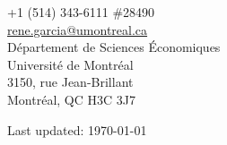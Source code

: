 \documentclass[margin,line]{res}
\begin{document}
\begin{resume}
\begin{minipage}{0.45\resumewidth}
  +1 (514) 343-6111 \#28490                                                               \\
  \href{mailto:rene.garcia@umontreal.ca}{rene.garcia@umontreal.ca}                        \\
  D\'epartement de Sciences \'Economiques                                                 \\
  Universit\'e de Montr\'eal                                                              \\
  3150, rue Jean-Brillant                                                                 \\
  Montr\'eal, QC  H3C 3J7                                                                 \\
\end{minipage}
     
\end{resume}

\vspace{0.5in}
\hfill {\footnotesize Last updated: \today}
\end{document}
